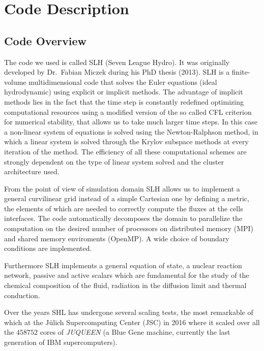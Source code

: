 \chapter{Code Description}
\section{Code Overview}
The code we used is called SLH (Seven League Hydro). It was originally developed by Dr.\ Fabian Miczek during his PhD thesis (2013). SLH is a finite-volume multidimensional code that solves the Euler equations (ideal hydrodynamic) using explicit or implicit methods. The advantage of implicit methods lies in the fact that the time step is constantly redefined optimizing computational resources using a modified version of the so called CFL criterion for numerical stability, that allows us to take much larger time steps. In this case a non-linear system of equations is solved using the Newton-Ralphson method, in which a linear system is solved through the Krylov subspace methods at every iteration of the method. The efficiency of all these computational schemes are strongly dependent on the type of linear system solved and the cluster architecture used. 

From the point of view of simulation domain SLH allows us to implement a general curvilinear grid instead of a simple Cartesian one by defining a metric, the elements of which are needed to correctly compute the fluxes at the cells interfaces. The code automatically decomposes the domain to parallelize the computation on the desired number of processors on distributed memory (MPI) and shared memory enviroments (OpenMP). A wide choice of boundary conditions are implemented. 

Furthermore SLH implements a general equation of state, a nuclear reaction network, passive and active scalars which are fundamental for the study of the chemical composition of the fluid, radiation in the diffusion limit and thermal conduction. 

Over the years SHL has undergone several scaling tests, the most remarkable of which at the Jülich Supercomputing Center (JSC) in 2016 where it scaled over all the $458752$ cores of \textit{JUQUEEN} (a Blue Gene machine, currently the last generation of IBM supercomputers).

